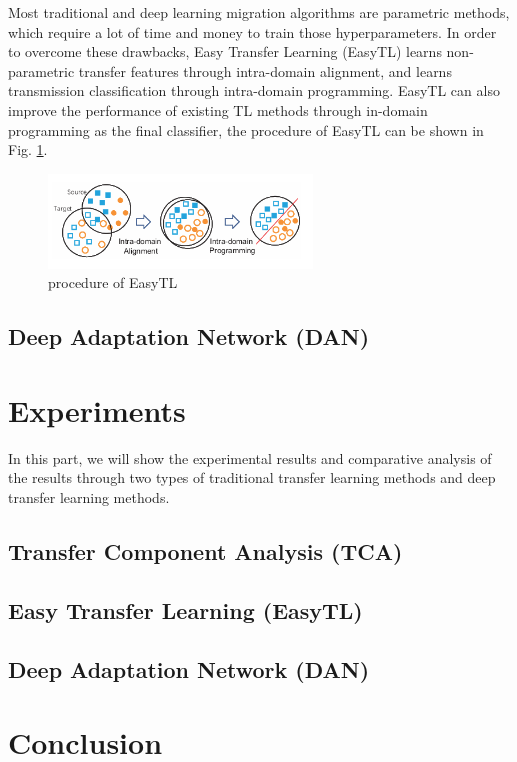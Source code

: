 \documentclass[conference]{IEEEtran}
\begin{document}
Most traditional and deep learning migration algorithms are parametric methods, which require a lot of time and money to train those hyperparameters. In order to overcome these drawbacks, Easy Transfer Learning (EasyTL) \cite{Wang2019Easy} learns non-parametric transfer features through intra-domain alignment, and learns transmission classification through intra-domain programming. EasyTL can also improve the performance of existing TL methods through in-domain programming as the final classifier, the procedure of EasyTL can be shown in Fig. \ref{kFig1}. 

\begin{center}
	\begin{figure}[htbp]
		\centering
		\label{kFig1}
		\includegraphics[width=7cm]{image/easyTL.png}
		\caption{procedure of EasyTL\cite{Wang2019Easy}}
	\end{figure}
\end{center}


\subsection{Deep Adaptation Network (DAN)}

\section{Experiments}

In this part, we will show the experimental results and comparative analysis of the results through two types of traditional transfer learning methods and deep transfer learning methods.


\subsection{Transfer Component Analysis (TCA)}



\subsection{Easy Transfer Learning (EasyTL)}


\subsection{Deep Adaptation Network (DAN)}

\section{Conclusion}

\cite{lowe1999object}

\end{document}
